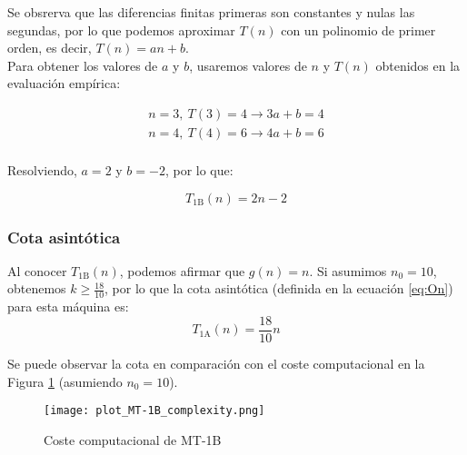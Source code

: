 Se obsrerva que las diferencias finitas primeras son constantes y nulas las segundas, por lo que podemos aproximar $T(n)$ con un polinomio de primer orden, es decir, $T(n) = an + b$.\\

Para obtener los valores de $a$ y $b$, usaremos valores de $n$ y $T(n)$ obtenidos en la evaluación empírica:

\begin{subequations}
    \begin{gather}
        n = 3,\ T(3) = 4 \rightarrow 3a + b = 4 \\
        n = 4,\ T(4) = 6 \rightarrow 4a + b = 6 \\
    \end{gather}
\end{subequations}

Resolviendo, $a = 2$ y $b = -2$, por lo que:

\begin{equation}
    T_{\mathrm{1B}}(n) = 2n - 2
\end{equation}

\subsubsection*{Cota asintótica}
Al conocer $T_{\mathrm{1B}}(n)$, podemos afirmar que $g(n) = n$. Si asumimos $n_0 = 10$, obtenemos $k \geq \frac{18}{10}$, por lo que la cota asintótica (definida en la ecuación \ref{eq:On}) para esta máquina es:
\begin{equation}
    T_{\mathrm{1A}}(n) = \frac{18}{10} n
\end{equation}

Se puede observar la cota en comparación con el coste computacional en la Figura \ref{fig:MT-1B_plot} (asumiendo $n_0 = 10$).

\begin{figure}[h]
    \centering
    \texttt{[image: plot\_MT-1B\_complexity.png]}
    \caption{Coste computacional de MT-1B}
    \label{fig:MT-1B_plot}
\end{figure}